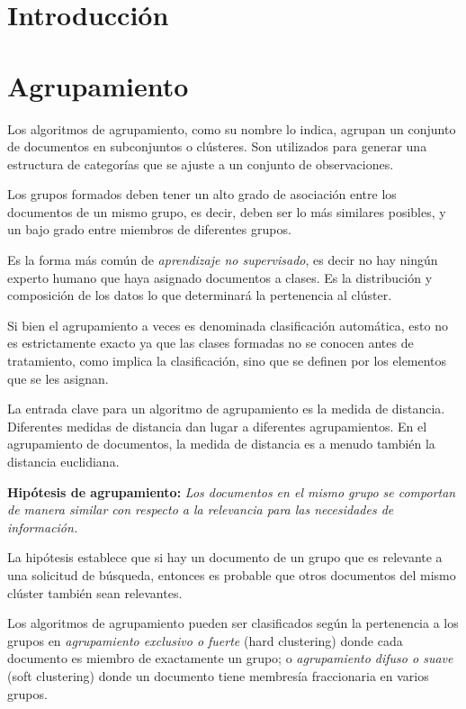 \documentclass{llncs}
\begin{document}
\newpage
{}

\section{Introducci\'on}

\section{Agrupamiento}

Los algoritmos de agrupamiento, como su nombre lo indica, agrupan un conjunto de documentos en subconjuntos o clústeres. Son utilizados para generar una estructura de categorías que se ajuste a un conjunto de observaciones. 

Los grupos formados deben tener un alto grado de asociación entre los documentos de un mismo grupo, es decir, deben ser lo m\'as similares posibles, y un bajo grado entre miembros de diferentes grupos. 

Es la forma más común de \textit{aprendizaje no supervisado}, es decir no hay ningún experto humano que haya asignado documentos a clases. Es la distribución y composición de los datos lo que determinará la pertenencia al clúster. 

Si bien el agrupamiento a veces es denominada clasificación automática, esto no es estrictamente exacto ya que las clases formadas no se conocen antes de tratamiento, como implica la clasificación, sino que se definen por los elementos que se les asignan.

La entrada clave para un algoritmo de agrupamiento es la medida de distancia. Diferentes medidas de distancia dan lugar a diferentes agrupamientos. En el agrupamiento de documentos, la medida de distancia es a menudo también la distancia euclidiana. 

\vspace{1em}
\textbf{Hip\'otesis de agrupamiento:} \textit{Los documentos en el mismo grupo se comportan de manera similar con respecto a la relevancia para las necesidades de información.}
	
\vspace{0.3em}
La hipótesis establece que si hay un documento de un grupo que es relevante a una solicitud de búsqueda, entonces es probable que otros documentos del mismo clúster también sean relevantes. 
\vspace{1em}

Los algoritmos de agrupamiento pueden ser clasificados seg\'un la pertenencia a los grupos en \textit{agrupamiento exclusivo o fuerte} (hard clustering) donde cada documento es miembro de exactamente un grupo; o \textit{agrupamiento difuso o suave} (soft clustering) donde un documento tiene membresía fraccionaria en varios grupos.
\end{document}
